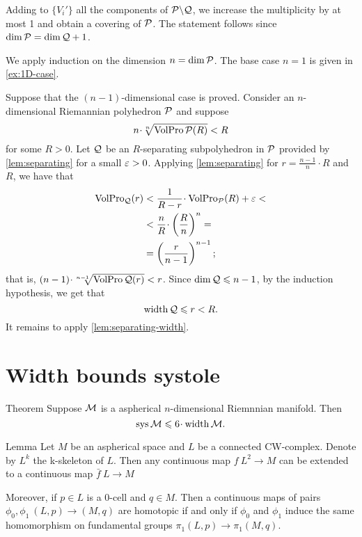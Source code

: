 Adding to  $\{V_i'\}$ all the components of $\mathcal{P}\backslash \mathcal{Q}$,
we increase the multiplicity by at most 1 and obtain a covering of $\mathcal{P}$.
The statement follows since $\dim \spc{P}= \dim \spc{Q}\z+1$.
\qeds

We apply induction on the dimension $n=\operatorname{\rm dim}\nolimits\mathcal{P}$.
The base case $n=1$ is given in \ref{ex:1D-case}.

Suppose that the  $(n-1)$-dimensional case is proved.
Consider an $n$-dimensional Riemannian polyhedron $\mathcal{P}$ and suppose
\[n\cdot \sqrt[n]{\VolPro\spc{P}(R)}< R\]
for some $R>0$.
Let $\mathcal{Q}$ be an $R$-separating subpolyhedron in $\mathcal{P}$ provided by \ref{lem:separating} for a small $\varepsilon>0$.
Applying  \ref{lem:separating} for $r=\tfrac{n-1}n\cdot R$ and $R$, we have that 
\begin{align*}
\VolPro_\spc{Q}(r) &< \frac 1{R-r}\cdot \VolPro_\spc{P}(R)+\eps<
\\
&<\frac {n}{R}\cdot\left(\frac{R}{n}\right)^n=
\\
&=\left(\frac{r}{n-1}\right)^{n-1};
\end{align*}
that is, $(n-1)\cdot \sqrt[n-1]{\VolPro\spc{Q}(r)}< r$.
Since $\operatorname{\rm dim}\nolimits\mathcal{Q}\leqslant n-1$, by the induction hypothesis, we get that
\[\operatorname{\rm width}\nolimits\mathcal{Q}\leqslant r<R.\]
It remains to apply \ref{lem:separating-width}.
\qeds





\section{Width bounds systole}

\begin{thm}{Theorem}\label{thm:sys<width}
Suppose $\mathcal{M}$ is a aspherical $n$-dimensional Riemnnian manifold.
Then 
\[\sys\spc{M}\le 6 \cdot \width \spc{M}.\]
\end{thm}

\begin{thm}{Lemma}\label{lem:aspherical-homotopy}
Let $M$ be an aspherical space and $L$ be a connected CW-complex.
Denote by $L^k$ the k-skeleton of $L$.
Then any continuous map $f\:L^2\to M$ can be extended to a continuous map $\bar f\:L\to M$

Moreover, if $p\in L$ is a 0-cell and $q\in M$.
Then a continuous maps of pairs $\phi_0,\phi_1\:(L,p)\to(M,q)$ are homotopic if and only if $\phi_0$ and $\phi_1$ induce the same homomorphism on fundamental groups $\pi_1(L,p)\to\pi_1(M,q)$.
\end{thm}

